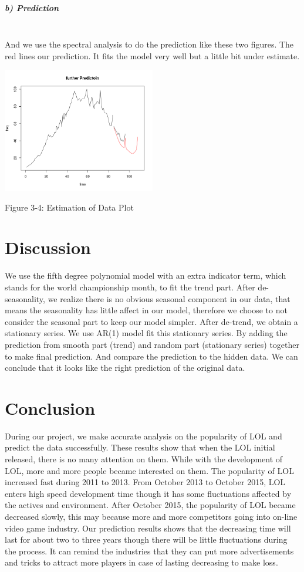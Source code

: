 \documentclass[11pt,a4paper]{article}
\begin{document}
\subparagraph{b) Prediction}\mbox{}\\ 
And we use the spectral analysis to do the prediction like these two figures.
The red lines our prediction. It fits the model very well but a little bit under estimate.
\begin{center}
\includegraphics[width=0.5\textwidth]{furPrePer.png}
\end{center}
\begin{center}
{Figure 3-4: Estimation of Data Plot}
\end{center}
\section*{Discussion}
We use the fifth degree polynomial model with an extra indicator term, which stands for the world championship month, to fit the trend part. After de-seasonality, we realize there is no obvious seasonal component in our data, that means the seasonality has little affect in our model, therefore we choose to not consider the seasonal part to keep our model simpler. After de-trend, we obtain a stationary series. We use AR(1) model fit this stationary series. By adding the prediction from smooth part (trend) and random part (stationary series) together to make final prediction. And compare the prediction to the hidden data. We can conclude that it looks like the right prediction of the original data.


\section*{Conclusion}
During our project, we make accurate analysis on the popularity of LOL and predict the data successfully. These results show that when the LOL initial released, there is no many attention on them. While with the development of LOL, more and more people became interested on them. The popularity of LOL increased fast during 2011 to 2013. From October 2013 to October 2015, LOL enters high speed development time though it has some fluctuations affected by the actives and environment. After October 2015, the popularity of LOL became decreased slowly, this may because more and more competitors going into on-line video game industry. Our prediction results shows that the decreasing time will last for about two to three years though there will be little  fluctuations during the process. It can remind the industries that they can put more advertisements and tricks to attract more players in case of lasting decreasing to make loss.
\end{document}
